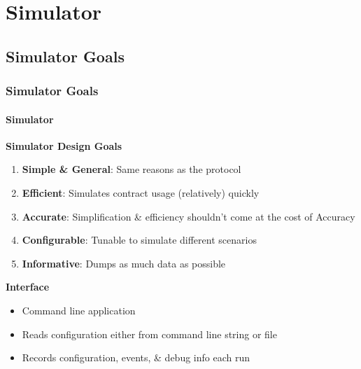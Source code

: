 \documentclass[
	10pt, %
	aspectratio=169, %
]{beamer}
\begin{document}
\section{Simulator}
\frame{\sectionpage}
\subsection{Simulator Goals}
\begin{frame}
	\frametitle{Simulator Goals}
	\framesubtitle{Simulator}

	{
		\large \bf
		Simulator Design Goals
	}
	\begin{enumerate}
		\item \textbf{Simple \& General}: Same reasons as the protocol
		\item \textbf{Efficient}: Simulates contract usage (relatively) quickly
		\item \textbf{Accurate}: Simplification \& efficiency shouldn't come at the cost of Accuracy
		\item \textbf{Configurable}: Tunable to simulate different scenarios
		\item \textbf{Informative}: Dumps as much data as possible
	\end{enumerate}

	\medskip

	{
		\large \bf
		Interface
	}
	\begin{itemize}
		\item Command line application
		\item Reads configuration either from command line string or file
		\item Records configuration, events, \& debug info each run
	\end{itemize}
\end{frame}
\end{document}
